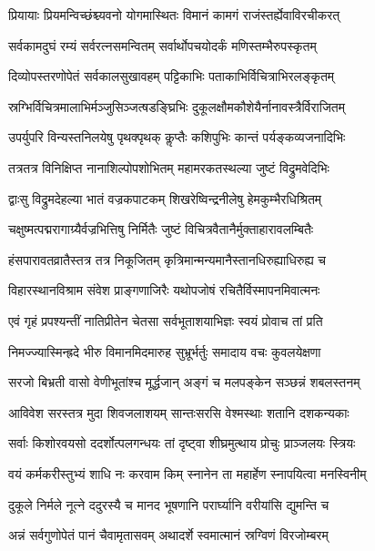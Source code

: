 
\twolineshloka
{प्रियायाः प्रियमन्विच्छंश्च्यवनो योगमास्थितः}
{विमानं कामगं राजंस्तर्ह्येवाविरचीकरत्}%

\twolineshloka
{सर्वकामदुघं रम्यं सर्वरत्नसमन्वितम्}
{सर्वार्थोपचयोदर्कं मणिस्तम्भैरुपस्कृतम्}%

\twolineshloka
{दिव्योपस्तरणोपेतं सर्वकालसुखावहम्}
{पट्टिकाभिः पताकाभिर्विचित्राभिरलङ्कृतम्}%

\twolineshloka
{स्रग्भिर्विचित्रमालाभिर्मञ्जुसिञ्जत्षडङ्घ्रिभिः}
{दुकूलक्षौमकौशेयैर्नानावस्त्रैर्विराजितम्}%

\twolineshloka
{उपर्युपरि विन्यस्तनिलयेषु पृथक्पृथक्}
{कॢप्तैः कशिपुभिः कान्तं पर्यङ्कव्यजनादिभिः}%

\twolineshloka
{तत्रतत्र विनिक्षिप्त नानाशिल्पोपशोभितम्}
{महामरकतस्थल्या जुष्टं विद्रुमवेदिभिः}%

\twolineshloka
{द्वाःसु विद्रुमदेहल्या भातं वज्रकपाटकम्}
{शिखरेष्विन्द्रनीलेषु हेमकुम्भैरधिश्रितम्}%

\twolineshloka
{चक्षुष्मत्पद्मरागाग्र्यैर्वज्रभित्तिषु निर्मितैः}
{जुष्टं विचित्रवैतानैर्मुक्ताहारावलम्बितैः}%

\twolineshloka
{हंसपारावतव्रातैस्तत्र तत्र निकूजितम्}
{कृत्रिमान्मन्यमानैस्तानधिरुह्याधिरुह्य च}%

\twolineshloka
{विहारस्थानविश्राम संवेश प्राङ्गणाजिरैः}
{यथोपजोषं रचितैर्विस्मापनमिवात्मनः}%

\twolineshloka
{एवं गृहं प्रपश्यन्तीं नातिप्रीतेन चेतसा}
{सर्वभूताशयाभिज्ञः स्वयं प्रोवाच तां प्रति}%

\twolineshloka
{निमज्ज्यास्मिन्ह्रदे भीरु विमानमिदमारुह}
{सुभ्रूर्भर्तुः समादाय वचः कुवलयेक्षणा}%

\twolineshloka
{सरजो बिभ्रती वासो वेणीभूतांश्च मूर्द्धजान्}
{अङ्गं च मलपङ्केन सञ्छन्नं शबलस्तनम्}%

\twolineshloka
{आविवेश सरस्तत्र मुदा शिवजलाशयम्}
{सान्तःसरसि वेश्मस्थाः शतानि दशकन्यकाः}%

\twolineshloka
{सर्वाः किशोरवयसो ददर्शोत्पलगन्धयः}
{तां दृष्ट्वा शीघ्रमुत्थाय प्रोचुः प्राञ्जलयः स्त्रियः}%

\twolineshloka
{वयं कर्मकरीस्तुभ्यं शाधि नः करवाम किम्}
{स्नानेन ता महार्हेण स्नापयित्वा मनस्विनीम्}%

\twolineshloka
{दुकूले निर्मले नूत्ने ददुरस्यै च मानद}
{भूषणानि परार्घ्यानि वरीयांसि द्युमन्ति च}%

\twolineshloka
{अन्नं सर्वगुणोपेतं पानं चैवामृतासवम्}
{अथादर्शे स्वमात्मानं स्रग्विणं विरजोम्बरम्}%

